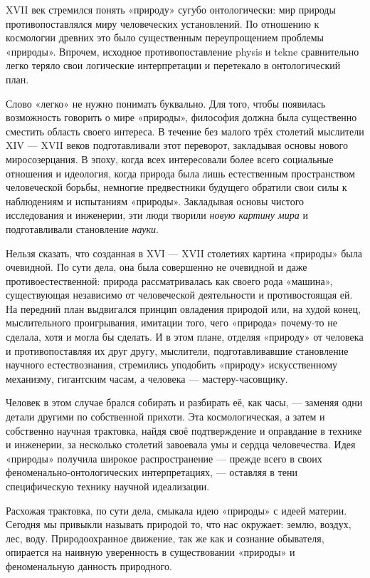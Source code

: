 \documentclass[11pt,a4paper]{article}
\begin{document}
XVII век стремился понять «природу» сугубо онтологически: мир природы
противопоставлялся миру человеческих установлений. По отношению к космологии
древних это было существенным переупрощением проблемы «природы». Впрочем,
исходное противопоставление physis и tekne сравнительно легко теряло свои
логические интерпретации и перетекало в онтологический план. 

Слово «легко» не нужно понимать буквально. Для того, чтобы появилась
возможность говорить о мире «природы», философия должна была существенно
сместить область своего интереса. В течение без малого трёх столетий мыслители
XIV — XVII веков подготавливали этот переворот, закладывая основы нового
миросозерцания. В эпоху, когда всех интересовали более всего социальные
отношения и идеология, когда природа была лишь естественным пространством
человеческой борьбы, немногие предвестники будущего обратили свои силы к
наблюдениям и испытаниям «природы». Закладывая основы чистого исследования и
инженерии, эти люди творили \emph{новую картину мира} и подготавливали
становление \emph{науки}.

Нельзя сказать, что созданная в XVI — XVII столетиях картина «природы» была
очевидной. По сути дела, она была совершенно не очевидной и даже
противоестественной: природа рассматривалась как своего рода «машина»,
существующая независимо от человеческой деятельности и противостоящая ей. На
передний план выдвигался принцип овладения природой или, на худой конец,
мыслительного проигрывания, имитации того, чего «природа» почему-то не
сделала, хотя и могла бы сделать. И в этом плане, отделяя «природу» от
человека и противопоставляя их друг другу, мыслители, подготавливавшие
становление научного естествознания, стремились уподобить «природу»
искусственному механизму, гигантским часам, а человека — мастеру-часовщику. 

Человек в этом случае брался собирать и разбирать её, как часы, — заменяя одни
детали другими по собственной прихоти. Эта космологическая, а затем и
собственно научная трактовка, найдя своё подтверждение и оправдание в технике
и инженерии, за несколько столетий завоевала умы и сердца человечества. Идея
«природы» получила широкое распространение — прежде всего в своих
феноменально-онтологических интерпретациях, — оставляя в тени специфическую
технику научной идеализации. 

Расхожая трактовка, по сути дела, смыкала идею «природы» с идеей
материи. Сегодня мы привыкли называть природой то, что нас окружает: землю,
воздух, лес, воду. Природоохранное движение, так же как и сознание обывателя,
опирается на наивную уверенность в существовании «природы» и феноменальную
данность природного. 
\end{document}
